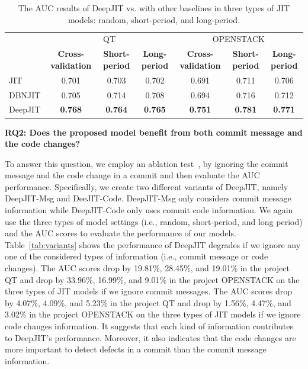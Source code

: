 \begin{table}[t!]
	\centering
	\caption{The AUC results of DeepJIT vs. with other baselines in three types of JIT models: random, short-period, and long-period.}
	\begin{tabular}{|l|c|c|c|c|c|c|}
		\hline
		\multirow{2}[4]{*}{} & \multicolumn{3}{c|}{QT} & \multicolumn{3}{c|}{OPENSTACK} \\
		\cline{2-7}          & \textbf{Cross-validation} & \textbf{Short-period} & \textbf{Long-period} & \textbf{Cross-validation} & \textbf{Short-period} & \textbf{Long-period} \\
		\hline
		\hline
		JIT   & 0.701 & 0.703 & 0.702 & 0.691 & 0.711 & 0.706 \\
		\hline
		DBNJIT & 0.705 & 0.714 & 0.708 & 0.694 & 0.716 & 0.712 \\
		\hline
		DeepJIT & \textbf{0.768} & \textbf{0.764} & \textbf{0.765} & \textbf{0.751} & \textbf{0.781} & \textbf{0.771} \\
		\hline
	\end{tabular}%
	\label{tab:results}%
\end{table}%

\noindent \textbf{RQ2: Does the proposed model benefit from both commit message and the code changes?}

To answer this question, we employ an ablation test~\cite{korbar2017deep, liu2017deep}, by ignoring the commit message and the code change in a commit and then evaluate the AUC performance. Specifically, we create two different variants of DeepJIT, namely DeepJIT-Msg and DeeJIT-Code. DeepJIT-Msg only considers commit message information while DeepJIT-Code only uses commit code information. We again use the three types of model settings (i.e., random, short-period, and long period) and the AUC scores to evaluate the performance of our models. Table~\ref{tab:variants} shows the performance of DeepJIT degrades if we ignore any one of the considered types of information (i.e., commit message or code changes). The AUC scores drop by 19.81\%, 28.45\%, and 19.01\% in the project QT and drop by 33.96\%, 16.99\%, and 9.01\% in the project OPENSTACK on the three types of JIT models if we ignore commit messages. The AUC scores drop by 4.07\%, 4.09\%, and 5.23\% in the project QT and drop by 1.56\%, 4.47\%, and 3.02\% in the project OPENSTACK on the three types of JIT models if we ignore code changes information. It suggests that each kind of information contributes to DeepJIT's performance. Moreover, it also indicates that the code changes are more important to detect defects in a commit than the commit message information.  


